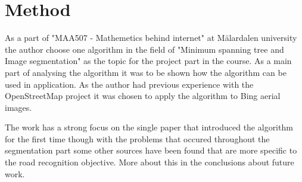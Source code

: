 \section{Method}
As a part of "MAA507 - Mathemetics behind internet" at M\"{a}lardalen university
the author choose one algorithm in the field of "Minimum spanning tree and
Image segmentation" as the topic for the project part in the course.
As a main part of analysing the algorithm it was to be shown how the
algorithm can be used in application. As the author had previous experience
with the OpenStreetMap project it was chosen to apply the algorithm to
Bing aerial images.

The work has a strong focus on the single paper that introduced
the algorithm for the first time though with the problems that occured
throughout the segmentation part some other sources have been found that
are more specific to the road recognition objective. More about this in the
conclusions about future work.
